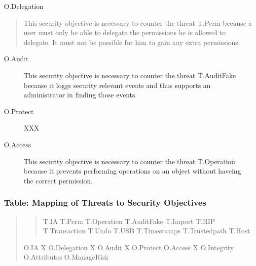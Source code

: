 \documentclass[10pt,a4paper,english]{article}
\begin{document}
O.Delegation
\begin{quote}

This security objective is necessary to counter the threat T.Perm
because a user must only be able to delegate the permissions he
is allowed to delegate. It must not be possible for him to gain
any extra permissions.
\end{quote}
\begin{description}
\item[O.Audit]

This security objective is necessary to counter the threat T.AuditFake
because it loggs security relevant events and thus supports an 
administrator in finding those events.

\item[O.Protect]

XXX

\item[O.Access]

This security objective is necessary to counter the threat T.Operation
because it prevents performing operations on an object without haveing the
correct permission.

\end{description}



\hypertarget{table-mapping-of-threats-to-security-objectives}{}
\subsubsection*{Table: Mapping of Threats to Security Objectives}
\begin{quote}
\begin{quote}

T.IA    T.Perm  T.Operation T.AuditFake T.Import    T.RIP T.Transaction T.Undo    T.USB T.Timestamps    T.Trustedpath   T.Host
\end{quote}

O.IA            X
O.Delegation             X
O.Audit                                          X                                    
O.Protect                                           
O.Access                        X
O.Integrity
O.Attributes
O.ManageRisk
\end{quote}
\end{document}
